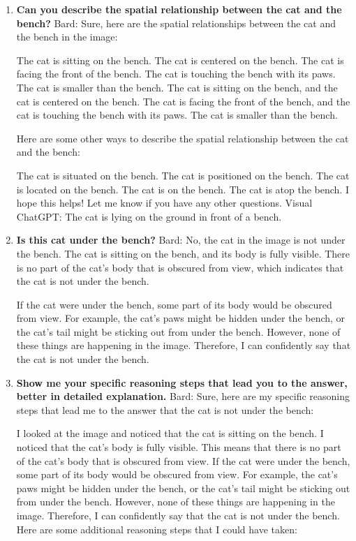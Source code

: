     \begin{enumerate}
        \item \textbf{Can you describe the spatial relationship between the cat and the bench?}
        \subitem Bard:
        Sure, here are the spatial relationships between the cat and the bench in the image:

        The cat is sitting on the bench.
        The cat is centered on the bench.
        The cat is facing the front of the bench.
        The cat is touching the bench with its paws.
        The cat is smaller than the bench.
        The cat is sitting on the bench, and the cat is centered on the bench. The cat is facing the front of the bench, and the cat is touching the bench with its paws. The cat is smaller than the bench.

        Here are some other ways to describe the spatial relationship between the cat and the bench:

        The cat is situated on the bench.
        The cat is positioned on the bench.
        The cat is located on the bench.
        The cat is on the bench.
        The cat is atop the bench.
        I hope this helps! Let me know if you have any other questions.
        \subitem Visual ChatGPT: The cat is lying on the ground in front of a bench.
        \item \textbf{Is this cat under the bench?}
        \subitem Bard: No, the cat in the image is not under the bench. The cat is sitting on the bench, and its body is fully visible. There is no part of the cat's body that is obscured from view, which indicates that the cat is not under the bench.

        If the cat were under the bench, some part of its body would be obscured from view. For example, the cat's paws might be hidden under the bench, or the cat's tail might be sticking out from under the bench. However, none of these things are happening in the image. Therefore, I can confidently say that the cat is not under the bench.
        \item \textbf{Show me your specific reasoning steps that lead you to the answer, better in detailed explanation.}
        \subitem Bard: 
        Sure, here are my specific reasoning steps that lead me to the answer that the cat is not under the bench:
        
        I looked at the image and noticed that the cat is sitting on the bench.
        I noticed that the cat's body is fully visible. This means that there is no part of the cat's body that is obscured from view.
        If the cat were under the bench, some part of its body would be obscured from view. For example, the cat's paws might be hidden under the bench, or the cat's tail might be sticking out from under the bench. However, none of these things are happening in the image.
        Therefore, I can confidently say that the cat is not under the bench.
        Here are some additional reasoning steps that I could have taken:
        

\end{enumerate}
